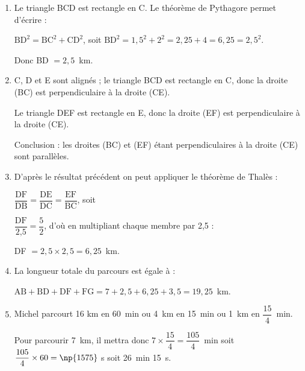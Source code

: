 \begin{enumerate}
\item %
Le triangle BCD est rectangle en C. Le théorème de Pythagore permet d'écrire :

$\text{BD}^2 = \text{BC}^2 + \text{CD}^2$, soit $\text{BD}^2 = 1,5^2 + 2^2 = 2,25 + 4 = 6,25 = 2,5^2$.

Donc BD $ = 2,5$~km.
\item %
C, D et E sont alignés ; le triangle  BCD est rectangle en C, donc la droite (BC) est perpendiculaire à la droite (CE).

Le triangle DEF est rectangle en E, donc la droite (EF) est perpendiculaire à la droite (CE).

Conclusion : les droites (BC) et (EF) étant perpendiculaires à la droite (CE) sont parallèles.  
\item %
D'après le résultat précédent on peut appliquer le théorème de Thalès :

$\dfrac{\text{DF}}{\text{DB}} = \dfrac{\text{DE}}{\text{DC}}  = \dfrac{\text{EF}}{\text{BC}}$, soit  

$\dfrac{\text{DF}}{\text{2,5}} = \dfrac{\text{5}}{\text{2}}$, d'où en multipliant chaque membre par 2,5 :

DF $ = 2,5 \times 2,5 = 6,25$~km.
\item %
La longueur totale du parcours est égale à :

$\text{AB} + \text{BD} + \text{DF} + \text{FG} = 7 + 2,5 + 6,25 + 3,5 = 19,25$~km.
\item %


Michel parcourt 16 km en 60~min ou 4~km en 15~min ou 1~km en $\dfrac{15}{4}$~min.

Pour parcourir 7~km, il mettra donc $7 \times \dfrac{15}{4} = \dfrac{105}{4}$~min soit $\dfrac{105}{4} \times 60 = \np{1575}~$s soit 26~min 15~s.
\end{enumerate}

\bigskip

